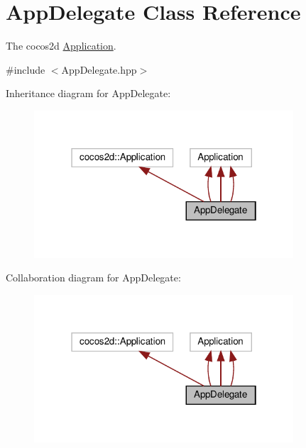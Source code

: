 \hypertarget{classAppDelegate}{}\section{App\+Delegate Class Reference}
\label{classAppDelegate}


The cocos2d \hyperlink{classApplication}{Application}.  




{\ttfamily \#include $<$App\+Delegate.\+hpp$>$}



Inheritance diagram for App\+Delegate\+:
\nopagebreak
\begin{figure}[H]
\begin{center}
\leavevmode
\includegraphics[width=274pt]{classAppDelegate__inherit__graph}
\end{center}
\end{figure}


Collaboration diagram for App\+Delegate\+:
\nopagebreak
\begin{figure}[H]
\begin{center}
\leavevmode
\includegraphics[width=274pt]{classAppDelegate__coll__graph}
\end{center}
\end{figure}
